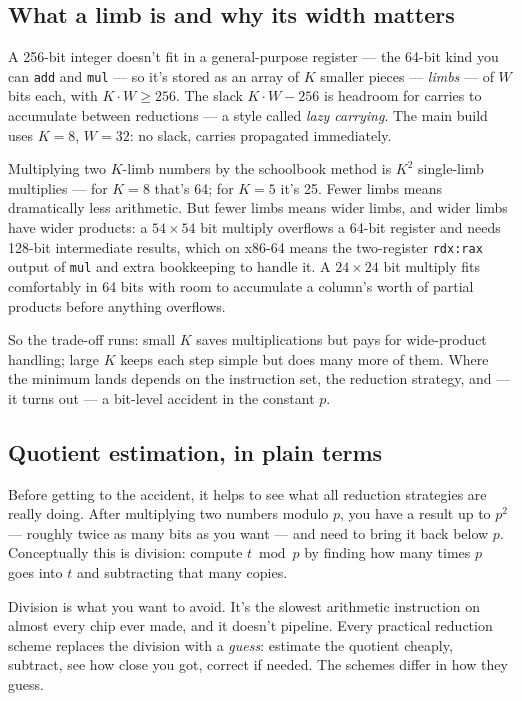 \documentclass[11pt,a4paper]{article}
\begin{document}
\subsection{What a limb is and why its width matters}

A 256-bit integer doesn't fit in a general-purpose register --- the
64-bit kind you can \texttt{add} and \texttt{mul} --- so it's stored
as an array of $K$ smaller pieces --- \emph{limbs} --- of $W$ bits
each, with $K \cdot W \ge 256$. The slack $K \cdot W - 256$ is
headroom for carries to accumulate between reductions --- a style
called \emph{lazy carrying}. The main build uses $K=8$, $W=32$: no
slack, carries propagated immediately.

Multiplying two $K$-limb numbers by the schoolbook method is $K^2$
single-limb multiplies --- for $K=8$ that's 64; for $K=5$ it's 25.
Fewer limbs means dramatically less arithmetic. But fewer limbs means
wider limbs, and wider limbs have wider products: a $54 \times 54$
bit multiply overflows a 64-bit register and needs 128-bit
intermediate results, which on x86-64 means the two-register
\texttt{rdx:rax} output of \texttt{mul} and extra bookkeeping to
handle it. A $24 \times 24$ bit multiply fits comfortably in 64 bits
with room to accumulate a column's worth of partial products before
anything overflows.

So the trade-off runs: small $K$ saves multiplications but pays for
wide-product handling; large $K$ keeps each step simple but does
many more of them. Where the minimum lands depends on the
instruction set, the reduction strategy, and --- it turns out --- a
bit-level accident in the constant $p$.

\subsection{Quotient estimation, in plain terms}

Before getting to the accident, it helps to see what all reduction
strategies are really doing. After multiplying two numbers modulo
$p$, you have a result up to $p^2$ --- roughly twice as many bits as
you want --- and need to bring it back below $p$. Conceptually this
is division: compute $t \bmod p$ by finding how many times $p$ goes
into $t$ and subtracting that many copies.

Division is what you want to avoid. It's the slowest arithmetic
instruction on almost every chip ever made, and it doesn't pipeline.
Every practical reduction scheme replaces the division with a
\emph{guess}: estimate the quotient cheaply, subtract, see how close
you got, correct if needed. The schemes differ in how they guess.
\end{document}
